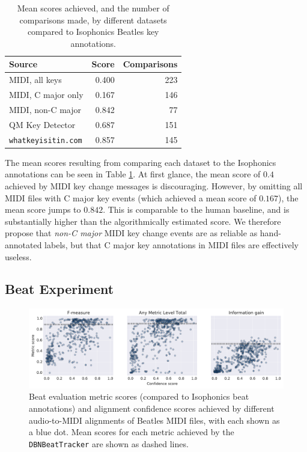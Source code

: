 \documentclass{article}
\begin{document}
\begin{table}
\begin{center}
\begin{tabular}{lrr}
  \toprule
  Source                     & Score & Comparisons \\
  \midrule
  MIDI, all keys             & 0.400 &         223 \\
  MIDI, C major only         & 0.167 &         146 \\
  MIDI, non-C major          & 0.842 &          77 \\
  QM Key Detector            & 0.687 &         151 \\
  \texttt{whatkeyisitin.com} & 0.857 &         145 \\
  \bottomrule
\end{tabular}
\end{center}
  \caption{Mean scores achieved, and the number of comparisons made, by different datasets compared to Isophonics Beatles key annotations.}
  \label{tab:key}
\end{table}

The mean scores resulting from comparing each dataset to the Isophonics annotations can be seen in Table \ref{tab:key}.
At first glance, the mean score of $0.4$ achieved by MIDI key change messages is discouraging. 
However, by omitting all MIDI files with C major key events (which achieved a mean score of $0.167$), the mean score jumps to $0.842$.
This is comparable to the human baseline, and is substantially higher than the algorithmically estimated score.
We therefore propose that \textit{non-C major} MIDI key change events are as reliable as hand-annotated labels, but that C major key annotations in MIDI files are effectively useless.

\subsection{Beat Experiment}

\begin{figure}
    \centerline{
    \includegraphics[width=\textwidth]{beat_scores.pdf}}
    \caption{Beat evaluation metric scores (compared to Isophonics beat annotations) and alignment confidence scores achieved by different audio-to-MIDI alignments of Beatles MIDI files, with each shown as a blue dot.
Mean scores for each metric achieved by the \texttt{DBNBeatTracker} \cite{bock2014multi} are shown as dashed lines.}
    \label{fig:beat}
\end{figure}
\end{document}
